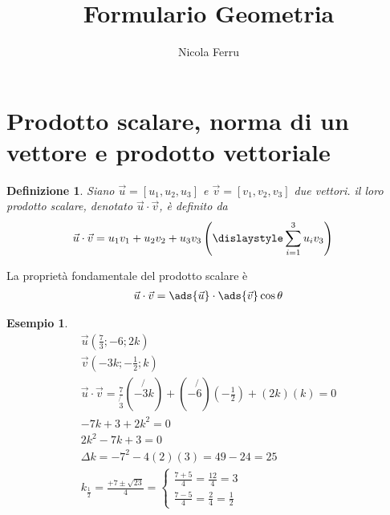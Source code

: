\documentclass{article}
\title{Formulario Geometria}
\author{Nicola Ferru}
\newtheorem{defi}{Definizione}[section]
\newtheorem{esempio}{Esempio}[section]
\begin{document}
\maketitle

\section{Prodotto scalare, norma di un vettore e prodotto vettoriale}
\label{sec:prodScalNormvetteprodvett}
\begin{defi}
  Siano $\vec{u}=[u_1,u_2,u_3]$ e $\vec{v}=[v_1,v_2,v_3]$ due vettori. il loro
  prodotto scalare, denotato $\vec{u}\cdot \vec{v}$, è definito da
  \begin{eqnarray}
    \label{eq:prodottoscalare}
    \vec{u}\cdot \vec{v}=u_1v_1+u_2v_2+u_3v_3 & \left(\dislaystyle\sum\limits_{i=1}^3 u_i v_3\right)
  \end{eqnarray}
\end{defi}
La proprietà fondamentale del prodotto scalare è
\begin{eqnarray}
  \label{eq:prodottoscalare1}
  \vec{u}\cdot \vec{v}=\ads{\vec{u}}\cdot\ads{\vec{v}}\cos\theta
\end{eqnarray}
\begin{esempio}
  \begin{eqnarray*}
    \vec{u} \left(\frac{7}{3};-6;2k\right)\\
    \vec{v} \left( -3k; -\frac{1}{2};k\right)\\
    \vec{u}\cdot \vec{v}=\frac{7}{\not{3}}(-\not{3}k)+(-\not{6})(-\frac{1}{2})+
    (2k)(k)=0\\
    -7k+3+2k^2 =0\\
    2k^2-7k+3=0\\
    \Delta k=-7^2-4(2)(3)=49-24=25\\
    k_{\frac{1}{2}}=\frac{+7\pm \sqrt{23}}{4}=
    \begin{cases}
      \frac{7+5}{4}=\frac{12}{4}=3\\
      \frac{7-5}{4}=\frac{2}{4}=\frac{1}{2}
    \end{cases}
  \end{eqnarray*}
\end{esempio}
\end{document}
